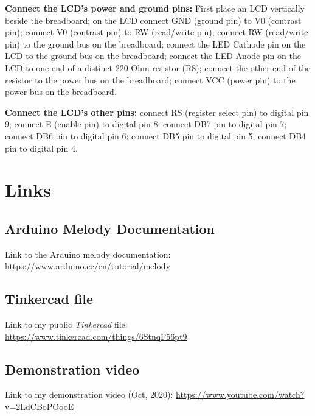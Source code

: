 \documentclass[a4paper]{article}
\begin{document}
\noindent \textbf{Connect the LCD’s power and ground pins:} First place an LCD vertically beside the breadboard; on the LCD connect GND (ground pin) to V0 (contrast pin); connect V0 (contrast pin) to RW (read/write pin); connect RW (read/write pin) to the ground bus on the breadboard; connect the LED Cathode pin on the LCD to the ground bus on the breadboard; connect the LED Anode pin on the LCD to one end of a distinct 220 Ohm resistor (R8); connect the other end of the resistor to the power bus on the breadboard; connect VCC (power pin) to the power bus on the breadboard.

\noindent \textbf{Connect the LCD’s other pins:} connect RS (register select pin) to digital pin 9; connect E (enable pin) to digital pin 8; connect DB7 pin to digital pin 7; connect DB6 pin to digital pin 6; connect DB5 pin to digital pin 5; connect DB4 pin to digital pin 4.

\section{Links}\label{sec:links}

\subsection{Arduino Melody Documentation}

Link to the Arduino melody documentation: \url{https://www.arduino.cc/en/tutorial/melody}

\subsection{Tinkercad file}

Link to my public \emph{Tinkercad} file: \url{https://www.tinkercad.com/things/6StnqF56pt9}

\subsection{Demonstration video}

Link to my demonstration video (Oct, 2020): \url{https://www.youtube.com/watch?v=2LdCBoPOooE}
\end{document}
